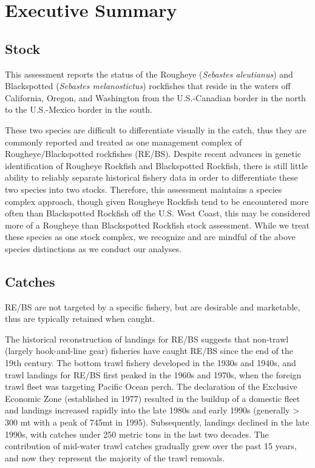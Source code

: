\documentclass[
]{article}
\begin{document}
\endgroup

\newpage{}

\section*{Executive Summary}\label{executive-summary}

\subsection*{Stock}\label{stock}

This assessment reports the status of the Rougheye (\emph{Sebastes
aleutianus}) and Blackspotted (\emph{Sebastes melanostictus}) rockfishes
that reside in the waters off California, Oregon, and Washington from
the U.S.-Canadian border in the north to the U.S.-Mexico border in the
south.

These two species are difficult to differentiate visually in the catch,
thus they are commonly reported and treated as one management complex of
Rougheye/Blackspotted rockfishes (RE/BS). Despite recent advances in
genetic identification of Rougheye Rockfish and Blackspotted Rockfish,
there is still little ability to reliably separate historical fishery
data in order to differentiate these two species into two stocks.
Therefore, this assessment maintains a species complex approach, though
given Rougheye Rockfish tend to be encountered more often than
Blackspotted Rockfish off the U.S. West Coast, this may be considered
more of a Rougheye than Blackspotted Rockfish stock assessment. While we
treat these species as one stock complex, we recognize and are mindful
of the above species distinctions as we conduct our analyses.

\subsection*{Catches}\label{catches}

RE/BS are not targeted by a specific fishery, but are desirable and
marketable, thus are typically retained when caught.

The historical reconstruction of landings for RE/BS suggests that
non-trawl (largely hook-and-line gear) fisheries have caught RE/BS since
the end of the 19th century. The bottom trawl fishery developed in the
1930s and 1940s, and trawl landings for RE/BS first peaked in the 1960s
and 1970s, when the foreign trawl fleet was targeting Pacific Ocean
perch. The declaration of the Exclusive Economic Zone (established in
1977) resulted in the buildup of a domestic fleet and landings increased
rapidly into the late 1980s and early 1990s (generally \textgreater{}
300 mt with a peak of 745mt in 1995). Subsequently, landings declined in
the late 1990s, with catches under 250 metric tons in the last two
decades. The contribution of mid-water trawl catches gradually grew over
the past 15 years, and now they represent the majority of the trawl
removals.
\end{document}
